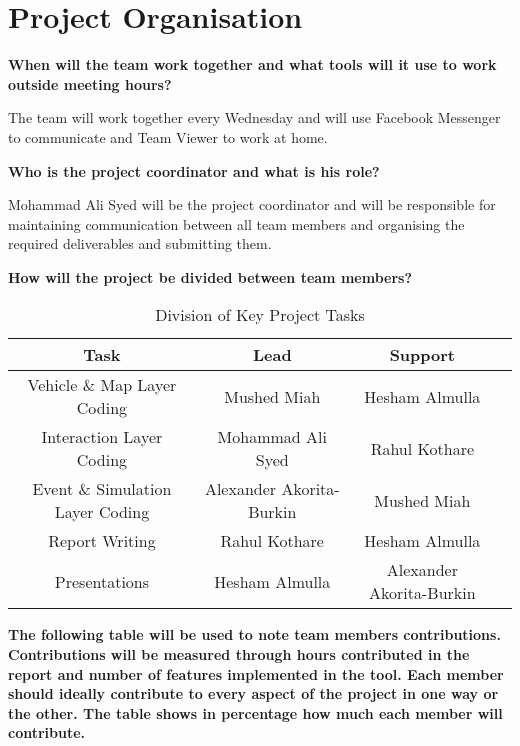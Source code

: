 \chapter{Project Organisation}
 
\noindent \textbf{When will the team work together and what tools will it use to work outside meeting hours?}

\vspace{1em}
\noindent The team will work together every Wednesday and will use Facebook Messenger to communicate and Team Viewer to work at home. 

\vspace{1em}
\noindent \textbf{Who is the project coordinator and what is his role?}

\vspace{1em}
\noindent Mohammad Ali Syed will be the project coordinator and will be responsible for maintaining communication between all team members and organising the required deliverables and submitting them. 

\vspace{1em}
\noindent \textbf{How will the project be divided between team members?}

\begin{table}[h!]
\centering
\begin{tabular}{ |c|c|c|c| } 
\hline
Task & Lead & Support \\
\hline
Vehicle \& Map Layer Coding & Mushed Miah & Hesham Almulla \\ 
\hline
Interaction Layer Coding & Mohammad Ali Syed & Rahul Kothare\\
\hline
Event \& Simulation Layer Coding & Alexander Akorita-Burkin & Mushed Miah \\ 
\hline
Report Writing& Rahul Kothare & Hesham Almulla\\
\hline
Presentations &Hesham Almulla& Alexander Akorita-Burkin \\
\hline
\end{tabular}
\caption{Division of Key Project Tasks}
\label{table:1}
\end{table}

\vspace{1em}
\noindent \textbf{The following table will be used to note team members contributions. Contributions will be measured through hours contributed in the report and number of features implemented in the tool. Each member should ideally contribute to every aspect of the project in one way or the other. The table shows in percentage how much each member will contribute.}

